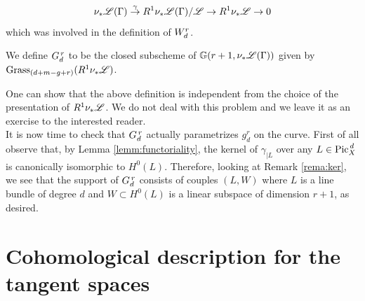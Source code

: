 	$$ \nu_{*} \mathscr{L}(\Gamma)\overset{\gamma}\to R^1 \nu_{*} \mathscr{L}(\Gamma) / \mathscr{L} \to R^1 \nu_{*} \mathscr{L} \to 0 $$
	which was involved in the definition of $W_d^r$.
	\begin{defi}
		We define $G_d^{\,r}$ to be the closed subscheme of $\mathbb{G}(r+1, \nu_{*} \mathscr{L}(\Gamma))$ given by $\operatorname{Grass}_{(d+m-g+r)}(R^1 \nu_{*} \mathscr{L})$.
	\end{defi}
	One can show that the above definition is independent from the choice of the presentation of $R^1 \nu_{*} \mathscr{L}$. We do not deal with this problem and we leave it as an exercise to the interested reader.\\

	It is now time to check that $G_d^{\,r}$ actually parametrizes $g_d^r$ on the curve. 
	First of all observe that, by Lemma \ref{lemm:functoriality}, the kernel of $\gamma_{\mid L}$ over any $L \in \operatorname{Pic}^{\,d}_X$ is canonically isomorphic to $H^0(L)$. 
	Therefore, looking at Remark \ref{rema:ker}, we see that the support of $G_d^{\,r}$ consists of couples $(L, W)$ where $L$ is a line bundle of degree $d$ and $W\subset H^0(L)$ is a linear subspace of dimension $r+1$, as desired.


\section{Cohomological description for the tangent spaces}

